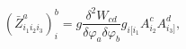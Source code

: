 \begin{equation}
\left( \bar{Z}_{i_{1}i_{2}i_{3}}^{a}\right) _{i}^{b}=g\frac{\delta ^{2}W_{cd}%
}{\delta \varphi _{a}\delta \varphi _{b}}%
g_{i[i_{1}}A_{i_{2}}^{c}A_{i_{3}]}^{d},  \label{i14a}
\end{equation}

